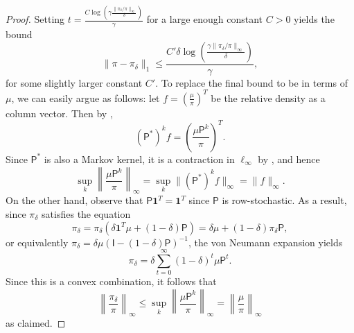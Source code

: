 \documentclass[11pt]{article}
\theoremstyle{remark}
\begin{document}
\begin{proof}
    Setting $t=\frac{C\log\left(\gamma\frac{\|\pi_{\delta}/\pi\|_{\infty}}{\delta}\right)}{\gamma}$ for a large enough constant $C>0$ yields the bound
    \begin{equation*}
        \|\pi-\pi_{\delta}\|_1\leq  \frac{C'\delta\log\left(\frac{\gamma\|\pi_{\delta}/\pi\|_{\infty}}{\delta}\right)}{\gamma},
    \end{equation*}
    for some slightly larger constant $C'$. To replace the final bound to be in terms of $\mu$, we can easily argue as follows: let $f=(\frac{\mu}{\pi})^T$ be the relative density as a column vector. Then by , 
    \begin{equation*}
        (\mathsf{P}^*)^kf = \left(\frac{\mu \mathsf{P}^k}{\pi}\right)^T.
    \end{equation*}
    Since $\mathsf{P}^*$ is also a Markov kernel, it is a contraction in $\ell_{\infty}$ by , and hence 
    \begin{equation*}
        \sup_k \left\|\frac{\mu \mathsf{P}^k}{\pi}\right\|_{\infty}=\sup_k \|(\mathsf{P}^*)^kf\|_{\infty} = \|f\|_{\infty}.
    \end{equation*}
    On the other hand, observe that $\mathsf{P}\bm{1}^T=\bm{1}^T$ since $\mathsf{P}$ is row-stochastic. As a result, since $\pi_{\delta}$ satisfies the equation
    \begin{equation*}
        \pi_{\delta} = \pi_{\delta}(\delta \bm{1}^T\mu+(1-\delta)\mathsf{P})=\delta\mu+(1-\delta)\pi_{\delta}\mathsf{P},
    \end{equation*}
    or equivalently $\pi_{\delta} = \delta\mu(\mathsf{I}-(1-\delta)\mathsf{P})^{-1}$, the von Neumann expansion yields
    \begin{equation*}
        \pi_{\delta} = \delta\sum_{t=0}^{\infty}(1-\delta)^t\mu\mathsf{P}^t.
    \end{equation*}
    Since this is a convex combination, it follows that
    \begin{equation}
    \label{eq:contract}
        \left\|\frac{\pi_{\delta}}{\pi}\right\|_{\infty}\leq \sup_k \left\|\frac{\mu \mathsf{P}^k}{\pi}\right\|_{\infty}=\left\|\frac{\mu}{\pi}\right\|_{\infty}
    \end{equation}
    as claimed.
\end{proof}
\end{document}
